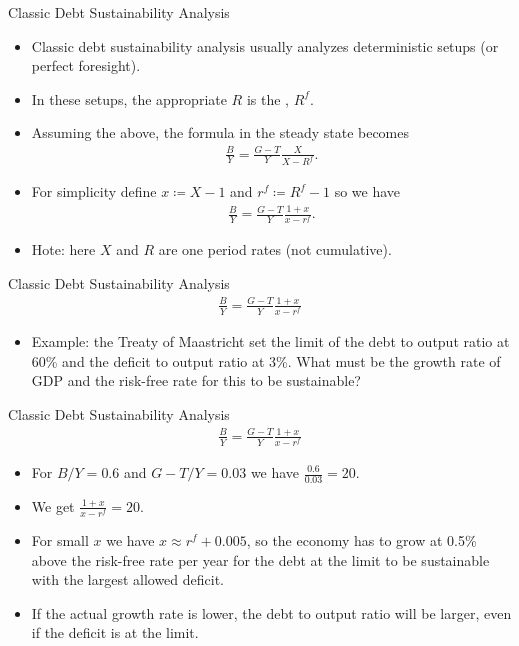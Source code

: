 \documentclass[11pt,xcolor={dvipsnames},aspectratio=159,hyperref={pdftex,pdfpagemode=UseNone,hidelinks,pdfdisplaydoctitle=true},usepdftitle=false]{beamer}
\begin{document}
\begin{frame}{Classic Debt Sustainability Analysis}

    \begin{itemize}
        \item Classic debt sustainability analysis usually analyzes deterministic setups (or perfect foresight).
        \item In these setups, the appropriate $R$ is the , $R^f$. 
        \item Assuming the above, the formula in the steady state becomes 
        \begin{align*}
            \frac{B}{Y} = \frac{G-T}{Y}\frac{X}{X-R^f}.
        \end{align*}
        \item For simplicity define $x\coloneqq X - 1$ and $r^f\coloneqq R^f - 1$ so we have         
        \begin{align*}
            \frac{B}{Y} = \frac{G-T}{Y}\frac{1+x}{x-r^f}.
        \end{align*}
        \item Hote: here $X$ and $R$ are one period rates (not cumulative). 
    \end{itemize}
\end{frame}

\begin{frame}{Classic Debt Sustainability Analysis}
    \begin{align*}
        \frac{B}{Y} = \frac{G-T}{Y}\frac{1+x}{x-r^f}
    \end{align*}
    \begin{itemize}
        \item Example: the Treaty of Maastricht set the limit of the debt to output ratio at 60\% and the deficit to output ratio at 3\%. What must be the growth rate of GDP and the risk-free rate for this to be sustainable?
        \end{itemize}
\end{frame}

\begin{frame}{Classic Debt Sustainability Analysis}
    \begin{align*}
        \frac{B}{Y} = \frac{G-T}{Y}\frac{1+x}{x-r^f}
    \end{align*}
    \begin{itemize}
        \item For $B\slash Y = 0.6$ and $G-T\slash Y = 0.03$ we have $\frac{0.6}{0.03} = 20$.
        \item We get $\frac{1+x}{x-r^f} = 20$.
        \item For small $x$ we have $x\approx r^f + 0.005$, so the economy has to grow at 0.5\% above the risk-free rate per year for the debt at the limit to be sustainable with the largest allowed deficit.
        \item If the actual growth rate is lower, the debt to output ratio will be larger, even if the deficit is at the limit.
    \end{itemize}
\end{frame}
\end{document}
